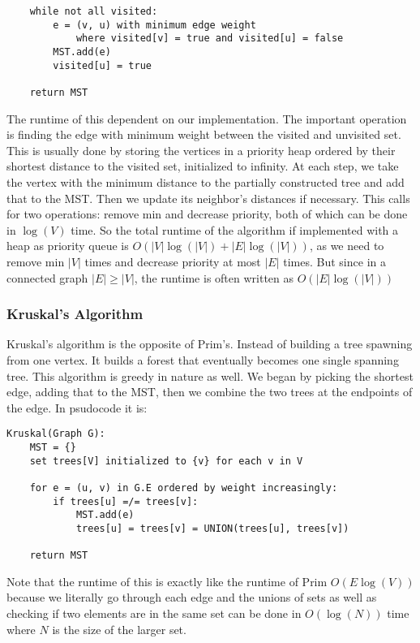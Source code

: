 \documentclass[12 pt, twoside] {article}
\begin{document}
{\begin{verbatim}
    while not all visited:
        e = (v, u) with minimum edge weight
            where visited[v] = true and visited[u] = false
        MST.add(e)
        visited[u] = true

    return MST
\end{verbatim}

The runtime of this dependent on our implementation. The important operation is
finding the edge with minimum weight between the visited and unvisited set. This
is usually done by storing the vertices in a priority heap ordered by their
shortest distance to the visited set, initialized to infinity. At each step, we
take the vertex with the minimum distance to the partially constructed tree and
add that to the MST. Then we update its neighbor's distances if necessary. This
calls for two operations: remove min and decrease priority, both of which can be
done in $\log (V)$ time. So the total runtime of the algorithm if implemented
with a heap as priority queue is $O(|V| \log(|V|) + |E| \log(|V|))$, as we need
to remove min $|V|$ times and decrease priority at most $|E|$ times. But since
in a connected graph $|E| \geq |V|$, the runtime is often written as $O(|E| \log
(|V|))$

\subsubsection*{Kruskal's Algorithm}

Kruskal's algorithm is the opposite of Prim's. Instead of building a tree
spawning from one vertex. It builds a forest that eventually becomes one single
spanning tree. This algorithm is greedy in nature as well. We began by picking
the shortest edge, adding that to the MST, then we combine the two trees at the
endpoints of the edge. In psudocode it is:
\begin{verbatim}
Kruskal(Graph G):
    MST = {}
    set trees[V] initialized to {v} for each v in V

    for e = (u, v) in G.E ordered by weight increasingly:
        if trees[u] =/= trees[v]:
            MST.add(e)
            trees[u] = trees[v] = UNION(trees[u], trees[v])

    return MST
\end{verbatim}

Note that the runtime of this is exactly like the runtime of Prim $O(E \log(V))$
because we literally go through each edge and the unions of sets as well as
checking if two elements are in the same set can be done in $O(\log(N))$ time
where $N$ is the size of the larger set.

}
\end{document}
